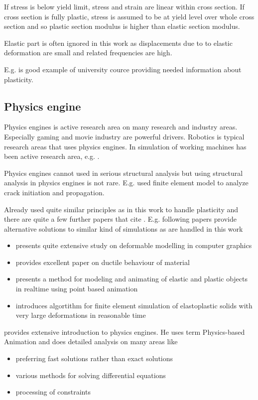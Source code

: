 If stress is below yield limit, stress and strain are linear within cross section.
If cross section is fully plastic, stress is assumed to be at yield level over whole cross section and 
so plastic section modulus is higher than elastic section modulus.

Elastic part is often ignored in this work as displacements due to to elastic deformation are small and 
related frequencies are high.

E.g. \cite{camp} is good example of university cource providing needed information about plasticity.

\subsection{Physics engine}

Physics engines is active research area on many research and industry areas.
Especially gaming and movie industry are powerful drivers.
Robotics is typical research areas that uses physics engines.
In \lut simulation of working machines has been active research area, e.g. \cite{moisio.thesis}.

Physics engines cannot used in serious structural analysis but using structural analysis in physics engines is not rare.  
E.g. \cite{Obrien:1999:GMA} used finite element model to analyze crack initiation and propagation.

Already \cite{cg1988} used quite similar principles as in this work to handle plasticity and there are quite a few further
papers that cite \cite{cg1988}. E.g. following papers provide alternative solutions to similar kind of simulations as 
are handled in this work 
\begin{itemize}
\item \cite{gibson1997survey} presents quite extensive study on deformable modelling in computer graphics
\item \cite{o2002graphical} provides excellent paper on ductile behaviour of material
\item \cite{muller2004point} presents a method for modeling and animating of 
elastic and plastic objects in realtime using point based animation
\item \cite{irving2004invertible} introduces algortithm for  finite element simulation of elastoplastic solids with very 
large deformations in reasonable time 
\end{itemize}


\cite{erleben.thesis} provides extensive introduction to physics engines. 
He uses term Physics-based Animation and does detailed analysis on many areas like
\begin{itemize}
\item preferring fast solutions rather than exact solutions
\item various methods for solving differential equations
\item processing of constraints
\end{itemize}


